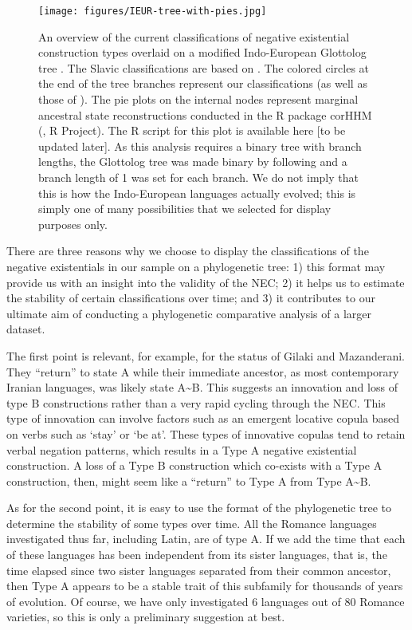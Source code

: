 ﻿\documentclass[output=paper]{langsci/langscibook}
\begin{document}
\begin{figure}
\caption{An overview of the current classifications of negative existential
construction types overlaid on a modified Indo-European Glottolog tree
\citep{HammarstromBank2018-ieur}. The Slavic classifications are based on
\citet{Veselinova2014}. The colored circles at the end of the tree branches
represent our classifications (as well as those of
\citealt{Veselinova2014}). The pie plots on the internal nodes represent
marginal ancestral state reconstructions conducted in the R package corHHM
(\citealt{Beaulieu2014}, R Project\nocite{RDev2008}). The R script for this plot is
available here [to be updated later]. As this analysis requires a binary
tree with branch lengths, the Glottolog tree was made binary by following
\citet{BouckaertLemey2012} and a branch length of 1 was set for each branch. We do not imply that this is how the Indo-European languages actually evolved; this is simply one of many possibilities that we selected for display purposes only.} 
\label{fig:ieur-tree}
\texttt{[image: figures/IEUR-tree-with-pies.jpg]}
\end{figure}

There are three reasons why we choose to display the classifications of the negative existentials in our sample on a phylogenetic tree: 1) this format may provide us with an insight into the validity of the NEC; 2) it helps us to estimate the stability of certain classifications over time; and 3) it contributes to our ultimate aim of conducting a phylogenetic comparative analysis of a larger dataset. 

The first point is relevant, for example, for the status of Gilaki and
Mazanderani. They ``return'' to state A while their immediate ancestor, as most contemporary Iranian languages, was likely state A{\textasciitilde}B. This suggests an innovation and loss of type B constructions rather than a very rapid cycling through the NEC. This type of innovation can involve factors such as an emergent locative copula based on verbs such as `stay' or `be at'. These types of innovative copulas tend to retain verbal negation patterns, which results in a Type A negative existential construction. A loss of a Type B construction which co-exists with a Type A construction, then, might seem like a “return” to Type A from Type A{\textasciitilde}B. 

As for the second point, it is easy to use the format of the phylogenetic tree to determine the stability of some types over time. All the Romance languages investigated thus far, including Latin, are of type A.  If we add the time that each of these languages has been independent from its sister languages, that is, the time elapsed since two sister languages separated from their common ancestor, then Type A appears to be a stable trait of this subfamily for thousands of years of evolution. Of course, we have only investigated 6 languages out of 80 Romance varieties, so this is only a preliminary suggestion at best. 
\end{document}
